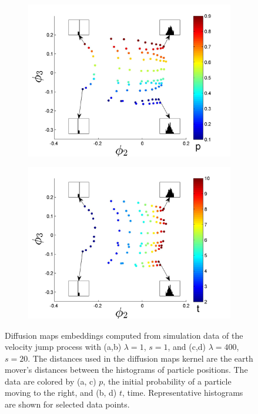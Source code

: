 \documentclass[prl, reprint, final, showkeys]{revtex4-1}
\begin{document}
\begin{figure}[t!]
\begin{subfigure}{\figwidth}
\includegraphics[width=\textwidth]{EMD_withhist_p_400}
\caption{}
\label{subfig:large_lambda_p}
\end{subfigure}
\begin{subfigure}{\figwidth}
\includegraphics[width=\textwidth]{EMD_withhist_t_400}
\caption{}
\label{subfig:large_lambda_t}
\end{subfigure}
\caption{Diffusion maps embeddings computed from simulation data of the velocity jump process with (a,b) $\lambda=1$, $s=1$, and (c,d) $\lambda=400$, $s=20$. The distances used in the diffusion maps kernel are the earth mover's distances between the histograms of particle positions. The data are colored by (a, c) $p$, the initial probability of a particle moving to the right, and (b, d) $t$, time. Representative histograms are shown for selected data points.}
\label{fig:dmaps_embed_emd}
\end{figure}
\end{document}
